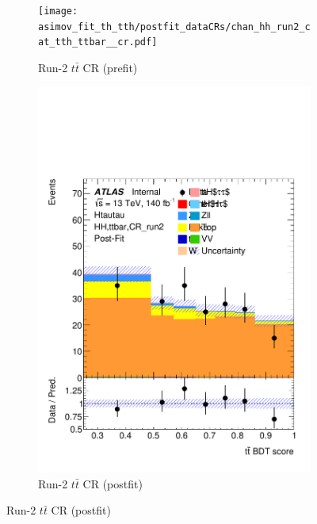 \begin{figure}[h]
  \centering
  \begin{subfigure}[t]{0.45\textwidth}
    \centering
    \texttt{[image: asimov\_fit\_th\_tth/postfit\_dataCRs/chan\_hh\_run2\_cat\_tth\_ttbar\_\_cr.pdf]}
    \caption{Run-2 $t\bar{t}$ CR (prefit)}
  \end{subfigure}
  \hfill
  \begin{subfigure}[t]{0.45\textwidth}
    \centering
    \includegraphics[width=\linewidth]{images/asimov_fit_th_tth/postfit_dataCRs/chan_hh_run2_cat_tth_ttbar__cr_postFit.pdf}
    \caption{Run-2 $t\bar{t}$ CR (postfit)}
  \end{subfigure}

  \vspace{0.4cm}


\end{figure}
